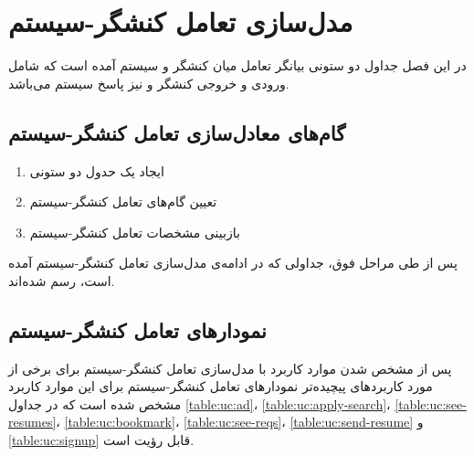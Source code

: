 \chapter{مدل‌سازی تعامل کنشگر-سیستم}
در این فصل جداول دو‌ ستونی بیانگر تعامل میان کنشگر و سیستم آمده است که شامل ورودی و خروجی کنشگر و نیز پاسخ سیستم می‌باشد.


\section{گام‌های معادل‌سازی تعامل کنشگر-سیستم}
\begin{enumerate}
	\item 
	ایجاد یک حدول دو ستونی
	
	\item 
	تعیین گام‌های تعامل کنشگر-سیستم
	
	\item 
	بازبینی مشخصات تعامل کنشگر-سیستم
\end{enumerate}

پس از طی مراحل فوق، جداولی که در ادامه‌ی مدل‌سازی تعامل کنشگر-سیستم آمده‌ است، رسم شده‌اند.

\section{نمودار‌های تعامل کنشگر-سیستم}\label{expandeds}
پس از مشخص شدن موارد کاربرد با مدل‌سازی تعامل کنشگر-سیستم برای برخی از مورد‌ کاربرد‌های پیچیده‌تر نمودار‌های تعامل کنشگر-سیستم برای این موارد کاربرد مشخص شده است که در جداول 
\ref{table:uc:ad}،
\ref{table:uc:apply-search}،
\ref{table:uc:see-resumes}،
\ref{table:uc:bookmark}،
\ref{table:uc:see-reqs}،
\ref{table:uc:send-resume} و
\ref{table:uc:signup}
قابل رؤیت است.

